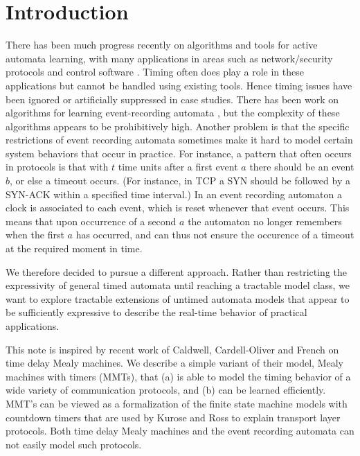 \section{Introduction}
\label{sec:intro}

There has been much progress recently on algorithms and tools for active automata learning, with many
applications in areas such as network/security protocols and control software \cite{Vaa16}.
Timing often does play a role in these applications but cannot be handled using existing tools. Hence
timing issues have been ignored or artificially suppressed in case studies.
There has been work on algorithms for learning event-recording automata \cite{GrinchteinJL10},
but the complexity of these algorithms appears to be prohibitively high.
Another problem is that the specific restrictions of event recording automata sometimes make it hard to model
certain system behaviors that occur in practice.
For instance, a pattern that often occurs in protocols is that with $t$ time units after a first event $a$
there should be an event $b$, or else a timeout occurs. (For instance, in TCP a SYN should be followed by a SYN-ACK
within a specified time interval.)
In an event recording automaton a clock is associated to each event, which is reset whenever that event occurs.
This means that upon occurrence of a second $a$ the automaton no longer remembers when the first $a$ has occurred,
and can thus not ensure the occurence of a timeout at the required moment in time.

We therefore decided to pursue a different approach. Rather than restricting the expressivity of general timed automata
until reaching a tractable model class, we want to explore tractable extensions of untimed automata models that appear to
be sufficiently expressive to describe the real-time behavior of practical applications.

This note is inspired by recent work of Caldwell, Cardell-Oliver and French \cite{CCF16} on time delay Mealy machines.
We describe a simple variant of their model, Mealy machines with timers (MMTs), that 
(a) is able to model the timing behavior of a wide variety of communication protocols, and
(b) can be learned efficiently.
MMT's can be viewed as a formalization of the finite state machine models with countdown timers that are used by
Kurose and Ross \cite{KR13} to explain transport layer protocols.
Both time delay Mealy machines \cite{CCF16} and the event recording automata \cite{GrinchteinJL10} can not easily model such protocols.


